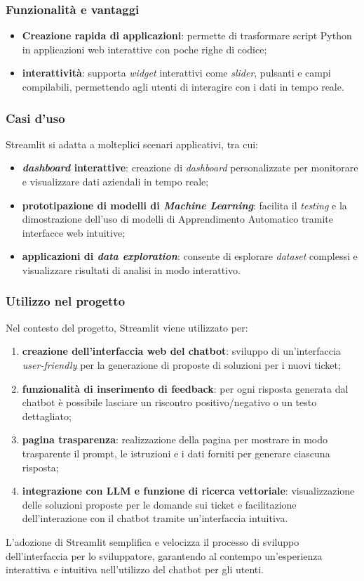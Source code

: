 \subsubsection{Funzionalità e vantaggi}
\begin{itemize}
    \item \textbf{Creazione rapida di applicazioni}: permette di trasformare script Python in applicazioni web interattive con poche righe di codice;
    \item \textbf{interattività}: supporta \textit{widget} interattivi come \textit{slider}, pulsanti e campi compilabili, permettendo agli utenti di interagire con i dati in tempo reale.
\end{itemize}

\subsubsection{Casi d'uso}
Streamlit si adatta a molteplici scenari applicativi, tra cui:
\begin{itemize}
    \item \textbf{\textit{dashboard} interattive}: creazione di \textit{dashboard} personalizzate per monitorare e visualizzare dati aziendali in tempo reale;
    \item \textbf{prototipazione di modelli di \textit{Machine Learning}}: facilita il \textit{testing} e la dimostrazione dell'uso di modelli di Apprendimento Automatico tramite interfacce web intuitive;
    \item \textbf{applicazioni di \textit{data exploration}}: consente di esplorare \textit{dataset} complessi e visualizzare risultati di analisi in modo interattivo.
\end{itemize}

\subsubsection{Utilizzo nel progetto}
Nel contesto del progetto, Streamlit viene utilizzato per:
\begin{enumerate}
    \item \textbf{creazione dell’interfaccia web del chatbot}: sviluppo di un’interfaccia \textit{user-friendly} per la generazione di proposte di soluzioni per i nuovi ticket;
    \item \textbf{funzionalità di inserimento di feedback}: per ogni risposta generata dal chatbot è possibile lasciare un riscontro positivo/negativo o un testo dettagliato;
    \item \textbf{pagina trasparenza}: realizzazione della pagina per mostrare in modo trasparente il prompt, le istruzioni e i dati forniti per generare ciascuna risposta;
    \item \textbf{integrazione con LLM e funzione di ricerca vettoriale}: visualizzazione delle soluzioni proposte per le domande sui ticket e facilitazione dell’interazione con il chatbot tramite un’interfaccia intuitiva.
\end{enumerate}
 L’adozione di Streamlit semplifica e velocizza il processo di sviluppo dell’interfaccia 
 per lo sviluppatore, garantendo al contempo un’esperienza interattiva e intuitiva 
 nell’utilizzo del chatbot per gli utenti.

 \newpage